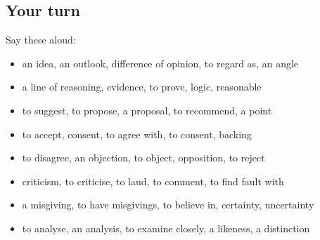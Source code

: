 \subsection*{Your turn}
Say these aloud:

\begin{itemize}
\raggedright
  \item an idea, an outlook, difference of opinion, to regard as, an angle
  \item a line of reasoning, evidence, to prove, logic, reasonable
  \item to suggest, to propose, a proposal, to recommend, a point
  \item to accept, consent, to agree with, to consent, backing
  \item to disagree, an objection, to object, opposition, to reject
  \item criticism, to criticise, to laud, to comment, to find fault with
  \item a misgiving, to have misgivings, to believe in, certainty, uncertainty
  \item to analyse, an analysis, to examine closely, a likeness, a distinction
\end{itemize}

